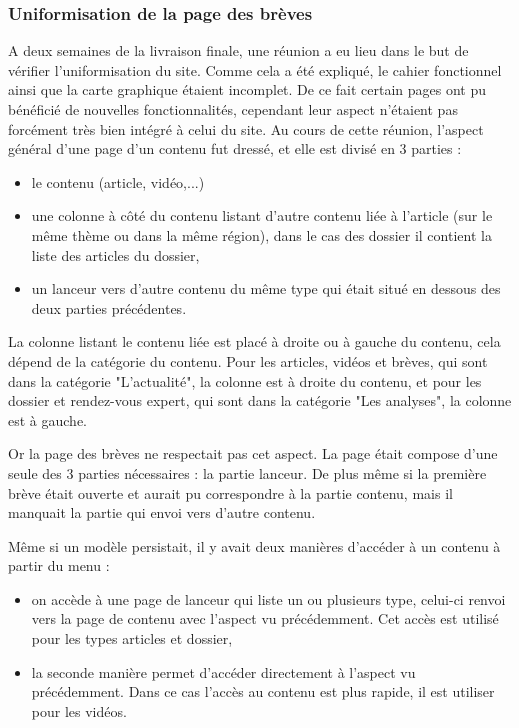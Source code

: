 \documentclass[12pt,a4paper]{article}
\begin{document}
\subsubsection{Uniformisation de la page des brèves}
A deux semaines de la livraison finale, une réunion a eu lieu dans le but de vérifier l'uniformisation du site. Comme cela a été expliqué, le cahier fonctionnel ainsi que la carte graphique étaient incomplet. De ce fait certain pages ont pu bénéficié de nouvelles fonctionnalités, cependant leur aspect n'étaient pas forcément très bien intégré à celui du site. Au cours de cette réunion, l'aspect général d'une page d'un contenu fut dressé, et elle est divisé en 3 parties :
\begin{itemize}
\item le contenu (article, vidéo,...)
\item une colonne à côté du contenu listant d'autre contenu liée à l'article (sur le même thème ou dans la même région), dans le cas des dossier il contient la liste des articles du dossier,
\item un lanceur vers d'autre contenu du même type qui était situé en dessous des deux parties précédentes.
\end{itemize}\par
La colonne listant le contenu liée est placé à droite ou à gauche du contenu, cela dépend de la catégorie du  contenu. Pour les articles, vidéos et brèves, qui sont dans la catégorie "L'actualité", la colonne est à droite du contenu, et pour les dossier et rendez-vous expert, qui sont dans la catégorie "Les analyses", la colonne est à gauche.\par
Or la page des brèves ne respectait pas cet aspect. La page était compose d'une seule des 3 parties nécessaires : la partie lanceur. De plus même si la première brève était ouverte et aurait pu correspondre à la partie contenu, mais il manquait la partie qui envoi vers d'autre contenu.\par 
Même si un modèle persistait, il y avait deux manières d'accéder à un contenu à partir du menu : 
\begin{itemize}
\item on accède à une page de lanceur qui liste un ou plusieurs type, celui-ci renvoi vers la page de contenu avec l'aspect vu précédemment. Cet accès est utilisé pour les types articles et dossier,
\item la seconde manière permet d'accéder directement à l'aspect vu précédemment. Dans ce cas l'accès au contenu est plus rapide, il est utiliser pour les vidéos. 
\end{itemize}\par 
\end{document}
